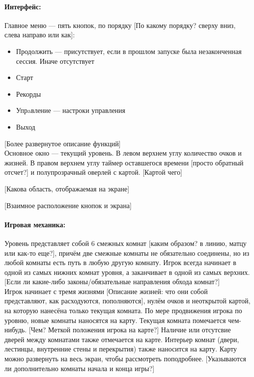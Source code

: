 \documentclass[12pt,a4paper]{article}
\begin{document}
\paragraph{Интерфейс:}
Главное меню --- пять кнопок, по порядку {\color{red} [По какому порядку? сверху вниз, слева направо или как]}:
\begin{itemize}
\item Продолжить --- присутствует, если в прошлом запуске была незаконченная сессия. Иначе отсутствует
\item Старт
\item Рекорды
\item Упрaвление --- настроки управления
\item Выход
\end{itemize}

{\color{red} [Более развернутое описание функций]}\\

Основное окно --- текущий уровень. В левом верхнем углу количество очков и жизней. В правом верхнем углу таймер оставшегося времени 
{\color{red} [просто обратный отсчет?]} и полупрозрачный оверлей с картой. {\color{red} [Картой чего]}

{\color{red} [Какова область, отображаемая на экране]}

{\color{red} [Взаимное расположение кнопок и экрана]}

\paragraph{Игровая механика:}
Уровень представляет собой 6 смежных комнат {\color{red} [каким образом? в линию, матцу или как-то еще?]}, причём две смежные комнаты не обязательно соединены, но из любой комнаты есть путь в любую другую комнату. Игрок всегда начинает в одной из самых нижних комнат уровня, а заканчивает в одной из самых верхних. 
{\color{red} [Если ли какие-либо законы/обязательные направления обхода комнат?]}\\

Игрок начинает с тремя жизнями {\color{red} [Описание жизней: что они собой представляют, как расходуются, пополняются]}, нулём очков и неоткрытой картой, на которую нанесёна только текущая комната. По мере продвижения игрока по уровню, новые комнаты наносятся на карту. Текущая комната помечается чем-нибудь. {\color{red} [Чем? Меткой положения игрока на карте?]} Наличие или отсутсвие дверей между комнатами также отмечается на карте. Интерьер комнат (двери, лестинцы, внутренние стены и перекрытия) также наносится на карту. Карту можно развернуть на весь экран, чтобы рассмотреть поподробнее.{\color{red} [Указываются ли дополнительно комнаты начала и конца игры?]}\\
\end{document}
